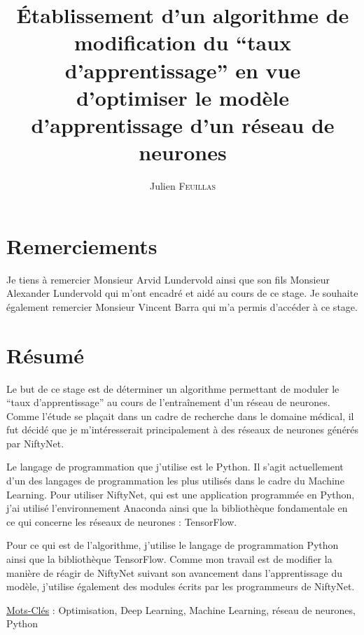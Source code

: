 \documentclass{book}
\title{\'Etablissement d'un algorithme de modification du ``taux d'apprentissage'' en vue d'optimiser le modèle d'apprentissage d'un réseau de neurones}
\author{Julien \textsc{Feuillas}}
\newcommand{\p}{\vspace{0.2cm}}
\begin{document}
	\mainmatter

	\pagedegarde

	\thispagestyle{empty}
	\pagestyle{plain}

	\cleardoublepage
	\renewcommand{\cleardoublepage}{\clearpage}

	\section*{Remerciements}
		Je tiens à remercier Monsieur Arvid Lundervold ainsi que son fils Monsieur Alexander Lundervold qui m'ont encadré et aidé au cours de ce stage. Je souhaite également remercier Monsieur Vincent Barra qui m'a permis d'accéder à ce stage.
	\clearpage

	\section*{Résumé}

		Le but de ce stage est de déterminer un algorithme permettant de moduler le ``taux d'apprentissage'' au cours de l'entraînement d'un réseau de neurones. Comme l'étude se plaçait dans un cadre de recherche dans le domaine médical, il fut décidé que je m'intéresserait principalement à des réseaux de neurones générés par NiftyNet\cite{niftynet}.\p

		Le langage de programmation que j'utilise est le Python. Il s'agit actuellement d'un des langages de programmation les plus utilisés dans le cadre du Machine Learning. Pour utiliser NiftyNet, qui est une application programmée en Python, j'ai utilisé l'environnement Anaconda ainsi que la bibliothèque fondamentale en ce qui concerne les réseaux de neurones : TensorFlow.

		Pour ce qui est de l'algorithme, j'utilise le langage de programmation Python ainsi que la bibliothèque TensorFlow. Comme mon travail est de modifier la manière de réagir de NiftyNet suivant son avancement dans l'apprentissage du modèle, j'utilise également des modules écrits par les programmeurs de NiftyNet\cite{nifty}.\p

		\ul{Mots-Cl\'es} : Optimisation, Deep Learning, Machine Learning, réseau de neurones, Python
\end{document}
